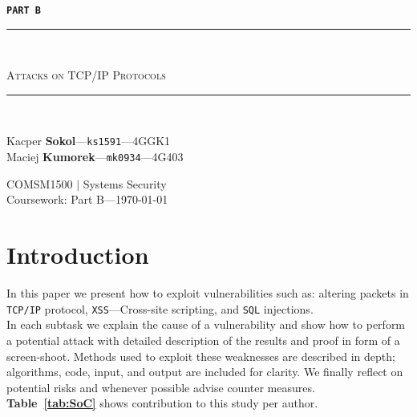 \documentclass[12pt, a4paper, pdflatex]{article}
\newcommand{\HRule}{\rule{\linewidth}{0.5mm}}
\begin{document}

\begin{center}
\vspace*{\fill}
  \Huge
 \texttt{\textbf{PART B}}

\end{center}


\begin{center}
    \begin{large}
    {\HRule \\[0.2cm]}
    \textsc{Attacks on TCP/IP Protocols}
    {\HRule \\[0.3cm]}
    \end{large}

    \begin{minipage}{ 0.49\textwidth }
        \begin{flushleft}
            Kacper \textbf{Sokol}---\texttt{ks1591}---4GGK1\\
            Maciej \textbf{Kumorek}---\texttt{mk0934}---4G403\\
        \end{flushleft}
    \end{minipage}
    \begin{minipage}{ 0.49\textwidth }
        \begin{flushright}
            {COMSM1500 $|$ Systems Security\\
            Coursework: Part B---\today\\[0.3cm]}
        \end{flushright}
    \end{minipage}
\end{center}
\vspace*{\fill}

\thispagestyle{empty}
\newpage
\setcounter{page}{1}

\section{Introduction}
In this paper we present how to exploit vulnerabilities such as: altering packets in \texttt{TCP/IP} protocol, \texttt{XSS}---Cross-site scripting, and \texttt{SQL} injections.\\
In each subtask we explain the cause of a vulnerability and show how to perform a potential attack with detailed description of the results and proof in form of a screen-shoot. Methods used to exploit these weaknesses are described in depth; algorithms, code, input, and output are included for clarity. We finally reflect on potential risks and whenever possible advise counter measures.\\
\textbf{Table~\ref{tab:SoC}} shows contribution to this study per author.
\end{document}
